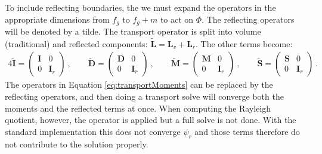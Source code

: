 \documentclass[12pt, letterpaper]{article}
\newcommand{\ve}[1]{\ensuremath{\mathbf{#1}}}
\begin{document}
To include reflecting boundaries, the we must expand the operators in the appropriate dimensions from $f_{g}$ to $f_{g} + m$ to act on $\Phi$. The reflecting operators will be denoted by a tilde. The transport operator is split into volume (traditional) and reflected components: $\tilde{\ve{L}} = \ve{L}_{v} + \ve{L}_{r}$. The other terms become:
%
\begin{alignat}{4}
  \ve{\tilde{I}} = \begin{pmatrix} \ve{I} & 0 \\ 0 & \ve{I}_{r} \end{pmatrix} \:, \nonumber
 \qquad
 \ve{\tilde{D}} = \begin{pmatrix} \ve{D} & 0 \\ 0 & \ve{I}_{r} \end{pmatrix} \:, \nonumber
 \qquad
 \ve{\tilde{M}} = \begin{pmatrix} \ve{M} & 0 \\ 0 & \ve{I}_{r} \end{pmatrix} \:, \nonumber
 \qquad
 \ve{\tilde{S}} = \begin{pmatrix} \ve{S} & 0 \\ 0 & \ve{I}_{r} \end{pmatrix} \:. \nonumber
\end{alignat}
%
The operators in Equation \eqref{eq:transportMoments} can be replaced by the reflecting operators, and then doing a transport solve will converge both the moments and the reflected terms at once. When computing the Rayleigh quotient, however, the operator is applied but a full solve is not done. With the standard implementation this does not converge $\psi_{r}$ and those terms therefore do not contribute to the solution properly. 
\end{document}

